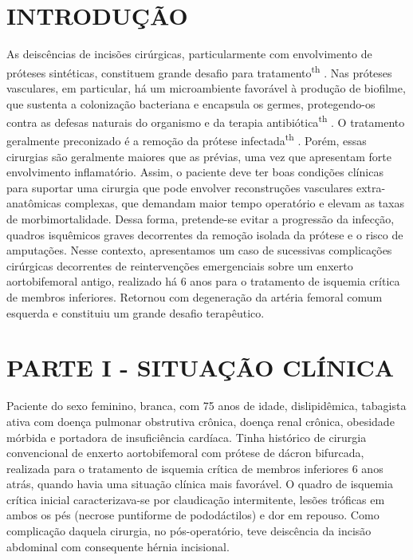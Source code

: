 \documentclass[numberinsection,times,10pt,spreadimages]{memoir}
\begin{document}
\section{INTRODUÇÃO}

As deiscências de incisões cirúrgicas, particularmente com envolvimento de
próteses
sintéticas, constituem grande desafio para tratamento\textsuperscript{th}
. Nas próteses vasculares, em particular, há um
microambiente favorável à produção de biofilme, que sustenta a colonização
bacteriana e encapsula os germes, protegendo-os contra as defesas naturais do
organismo e da terapia antibiótica\textsuperscript{th}
. O tratamento geralmente preconizado é a remoção da prótese
infectada\textsuperscript{th}
. Porém, essas
cirurgias são geralmente maiores que as prévias, uma vez que apresentam forte
envolvimento inflamatório. Assim, o paciente deve ter boas condições clínicas
para
suportar uma cirurgia que pode envolver reconstruções vasculares
extra-anatômicas
complexas, que demandam maior tempo operatório e elevam as taxas de
morbimortalidade. Dessa forma, pretende-se evitar a progressão da infecção,
quadros
isquêmicos graves decorrentes da remoção isolada da prótese e o risco de
amputações.
Nesse contexto, apresentamos um caso de sucessivas complicações cirúrgicas
decorrentes de reintervenções emergenciais sobre um enxerto aortobifemoral
antigo,
realizado há 6 anos para o tratamento de isquemia crítica de membros inferiores.
Retornou com degeneração da artéria femoral comum esquerda e constituiu um
grande
desafio terapêutico.

\section{PARTE I - SITUAÇÃO CLÍNICA}

Paciente do sexo feminino, branca, com 75 anos de idade, dislipidêmica,
tabagista
ativa com doença pulmonar obstrutiva crônica, doença renal crônica, obesidade
mórbida e portadora de insuficiência cardíaca. Tinha histórico de cirurgia
convencional de enxerto aortobifemoral com prótese de dácron bifurcada,
realizada
para o tratamento de isquemia crítica de membros inferiores 6 anos atrás, quando
havia uma situação clínica mais favorável. O quadro de isquemia crítica inicial
caracterizava-se por claudicação intermitente, lesões tróficas em ambos os pés
(necrose puntiforme de pododáctilos) e dor em repouso. Como complicação daquela
cirurgia, no pós-operatório, teve deiscência da incisão abdominal com
consequente
hérnia incisional.
\end{document}
